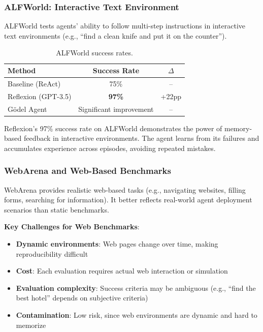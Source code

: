 \subsubsection{ALFWorld: Interactive Text Environment}

ALFWorld tests agents' ability to follow multi-step instructions in interactive text environments (e.g., ``find a clean knife and put it on the counter'').

\begin{table}[htbp]
\centering
\caption{ALFWorld success rates.}
\label{tab:alfworld-results}
\begin{tabular}{lcc}
\toprule
\textbf{Method} & \textbf{Success Rate} & \textbf{$\Delta$} \\
\midrule
Baseline (ReAct) & 75\% & -- \\
Reflexion (GPT-3.5) & \textbf{97\%} & +22pp \\
G\"{o}del Agent & Significant improvement & -- \\
\bottomrule
\end{tabular}
\end{table}

Reflexion's 97\% success rate on ALFWorld demonstrates the power of memory-based feedback in interactive environments. The agent learns from its failures and accumulates experience across episodes, avoiding repeated mistakes.

\subsubsection{WebArena and Web-Based Benchmarks}

WebArena provides realistic web-based tasks (e.g., navigating websites, filling forms, searching for information). It better reflects real-world agent deployment scenarios than static benchmarks.

\textbf{Key Challenges for Web Benchmarks}:
\begin{itemize}
\item \textbf{Dynamic environments}: Web pages change over time, making reproducibility difficult
\item \textbf{Cost}: Each evaluation requires actual web interaction or simulation
\item \textbf{Evaluation complexity}: Success criteria may be ambiguous (e.g., ``find the best hotel'' depends on subjective criteria)
\item \textbf{Contamination}: Low risk, since web environments are dynamic and hard to memorize
\end{itemize}

